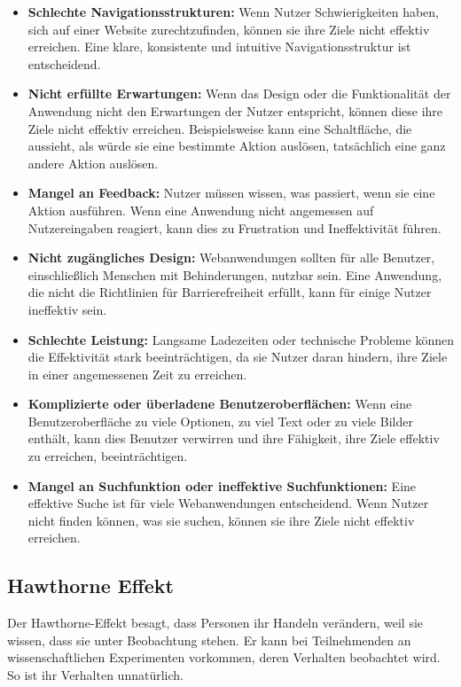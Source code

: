 \begin{itemize}
    \item \textbf{Schlechte Navigationsstrukturen:} Wenn Nutzer Schwierigkeiten haben, sich auf einer Website zurechtzufinden, können sie ihre Ziele nicht effektiv erreichen. Eine klare, konsistente und intuitive Navigationsstruktur ist entscheidend.
    \item \textbf{Nicht erfüllte Erwartungen:} Wenn das Design oder die Funktionalität der Anwendung nicht den Erwartungen der Nutzer entspricht, können diese ihre Ziele nicht effektiv erreichen. Beispielsweise kann eine Schaltfläche, die aussieht, als würde sie eine bestimmte Aktion auslösen, tatsächlich eine ganz andere Aktion auslösen.
    \item \textbf{Mangel an Feedback:} Nutzer müssen wissen, was passiert, wenn sie eine Aktion ausführen. Wenn eine Anwendung nicht angemessen auf Nutzereingaben reagiert, kann dies zu Frustration und Ineffektivität führen.
    \item \textbf{Nicht zugängliches Design:} Webanwendungen sollten für alle Benutzer, einschließlich Menschen mit Behinderungen, nutzbar sein. Eine Anwendung, die nicht die Richtlinien für Barrierefreiheit erfüllt, kann für einige Nutzer ineffektiv sein.
    \item \textbf{Schlechte Leistung:} Langsame Ladezeiten oder technische Probleme können die Effektivität stark beeinträchtigen, da sie Nutzer daran hindern, ihre Ziele in einer angemessenen Zeit zu erreichen.
    \item \textbf{Komplizierte oder überladene Benutzeroberflächen:} Wenn eine Benutzeroberfläche zu viele Optionen, zu viel Text oder zu viele Bilder enthält, kann dies Benutzer verwirren und ihre Fähigkeit, ihre Ziele effektiv zu erreichen, beeinträchtigen.
    \item \textbf{Mangel an Suchfunktion oder ineffektive Suchfunktionen:} Eine effektive Suche ist für viele Webanwendungen entscheidend. Wenn Nutzer nicht finden können, was sie suchen, können sie ihre Ziele nicht effektiv erreichen.

\end{itemize}

\subsection{Hawthorne Effekt}
Der Hawthorne-Effekt besagt, dass Personen ihr Handeln verändern, weil sie wissen, dass sie unter Beobachtung stehen. Er kann bei Teilnehmenden an wissenschaftlichen Experimenten vorkommen, deren Verhalten beobachtet wird. So ist ihr Verhalten unnatürlich.

